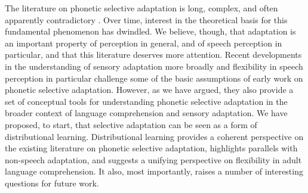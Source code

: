 The literature on phonetic selective adaptation is long, complex, and often apparently contradictory \cites[as summarized by][]{Samuel1986}[and][]{Remez1987}.  Over time, interest in the theoretical basis for this fundamental phenomenon has dwindled.  We believe, though, that adaptation is an important property of perception in general, and of speech perception in particular, and that this literature deserves more attention. Recent developments in the understanding of sensory adaptation more broadly and flexibility in speech perception in particular challenge some of the basic assumptions of early work on phonetic selective adaptation.  However, as we have argued, they also provide a set of conceptual tools for understanding phonetic selective adaptation in the broader context of language comprehension and sensory adaptation.  We have proposed, to start, that selective adaptation can be seen as a form of distributional learning.  Distributional learning provides a coherent perspective on the existing literature on phonetic selective adaptation, highlights parallels with non-speech adaptation, and suggests a unifying perspective on flexibility in adult language comprehension.  It also, most importantly, raises a number of interesting questions for future work.

